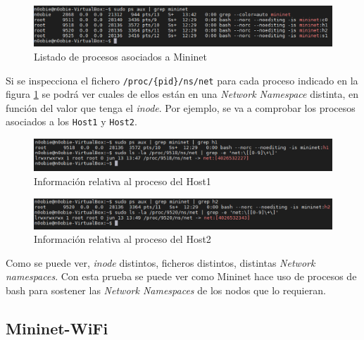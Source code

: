 \begin{figure}[ht]
    \centering
    \includegraphics[width=15.5cm]{archivos/img/teoria/mn_03.png}
    \caption{Listado de procesos asociados a Mininet}
    \label{fig:mininet_03}
\end{figure}

Si se inspecciona el fichero \texttt{/proc/\{pid\}/ns/net} para cada proceso indicado en la figura \ref{fig:mininet_03} se podrá ver cuales de ellos están en una \textit{Network Namespace} distinta, en función del valor que tenga el \textit{inode}. Por ejemplo, se va a comprobar los procesos asociados a los \texttt{Host1} y \texttt{Host2}.\\
\par

\begin{figure}[ht]
    \centering
    \includegraphics[width=15.5cm]{archivos/img/teoria/mn_04.png}
    \caption{Información relativa al proceso del Host1}
    \label{fig:mininet_04}
\end{figure}

\newpage

\begin{figure}[ht]
    \centering
    \includegraphics[width=15.5cm]{archivos/img/teoria/mn_05.png}
    \caption{Información relativa al proceso del Host2}
    \label{fig:mininet_05}
\end{figure}

Como se puede ver, \textit{inode} distintos, ficheros distintos, distintas \textit{Network namespaces}. Con esta prueba se puede ver como Mininet hace uso de procesos de bash para sostener las \textit{Network Namespaces} de los nodos que lo requieran.


\subsection{Mininet-WiFi}

